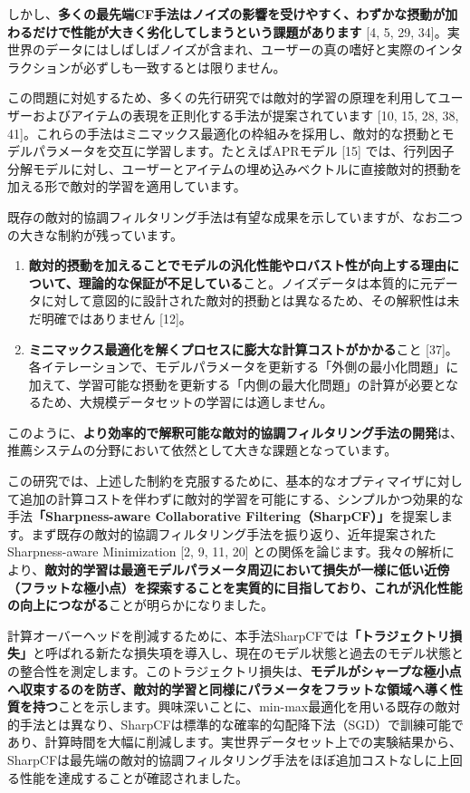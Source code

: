 \documentclass[11pt,a4paper]{article}
\begin{document}
しかし、\textbf{多くの最先端CF手法はノイズの影響を受けやすく、わずかな摂動が加わるだけで性能が大きく劣化してしまうという課題があります} [4, 5, 29, 34]。実世界のデータにはしばしばノイズが含まれ、ユーザーの真の嗜好と実際のインタラクションが必ずしも一致するとは限りません。

この問題に対処するため、多くの先行研究では敵対的学習の原理を利用してユーザーおよびアイテムの表現を正則化する手法が提案されています [10, 15, 28, 38, 41]。これらの手法はミニマックス最適化の枠組みを採用し、敵対的な摂動とモデルパラメータを交互に学習します。たとえばAPRモデル [15] では、行列因子分解モデルに対し、ユーザーとアイテムの埋め込みベクトルに直接敵対的摂動を加える形で敵対的学習を適用しています。

既存の敵対的協調フィルタリング手法は有望な成果を示していますが、なお二つの大きな制約が残っています。

\begin{enumerate}
    \item \textbf{敵対的摂動を加えることでモデルの汎化性能やロバスト性が向上する理由について、理論的な保証が不足している}こと。ノイズデータは本質的に元データに対して意図的に設計された敵対的摂動とは異なるため、その解釈性は未だ明確ではありません [12]。
    \item \textbf{ミニマックス最適化を解くプロセスに膨大な計算コストがかかる}こと [37]。各イテレーションで、モデルパラメータを更新する「外側の最小化問題」に加えて、学習可能な摂動を更新する「内側の最大化問題」の計算が必要となるため、大規模データセットの学習には適しません。
\end{enumerate}

このように、\textbf{より効率的で解釈可能な敵対的協調フィルタリング手法の開発}は、推薦システムの分野において依然として大きな課題となっています。

この研究では、上述した制約を克服するために、基本的なオプティマイザに対して追加の計算コストを伴わずに敵対的学習を可能にする、シンプルかつ効果的な手法\textbf{「Sharpness-aware Collaborative Filtering（SharpCF）」}を提案します。まず既存の敵対的協調フィルタリング手法を振り返り、近年提案されたSharpness-aware Minimization [2, 9, 11, 20] との関係を論じます。我々の解析により、\textbf{敵対的学習は最適モデルパラメータ周辺において損失が一様に低い近傍（フラットな極小点）を探索することを実質的に目指しており、これが汎化性能の向上につながる}ことが明らかになりました。

計算オーバーヘッドを削減するために、本手法SharpCFでは\textbf{「トラジェクトリ損失」}と呼ばれる新たな損失項を導入し、現在のモデル状態と過去のモデル状態との整合性を測定します。このトラジェクトリ損失は、\textbf{モデルがシャープな極小点へ収束するのを防ぎ、敵対的学習と同様にパラメータをフラットな領域へ導く性質を持つ}ことを示します。興味深いことに、min-max最適化を用いる既存の敵対的手法とは異なり、SharpCFは標準的な確率的勾配降下法（SGD）で訓練可能であり、計算時間を大幅に削減します。実世界データセット上での実験結果から、SharpCFは最先端の敵対的協調フィルタリング手法をほぼ追加コストなしに上回る性能を達成することが確認されました。
\end{document}
